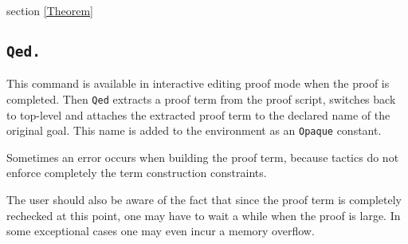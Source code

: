 \begin{ErrMsgs}
\item {}
\end{ErrMsgs}

\SeeAlso section \ref{Theorem}

\subsection{\tt Qed.}\label{Qed}
This command is available in interactive editing proof mode when the
proof is completed.  Then {\tt Qed} extracts a proof term from the
proof script, switches back to {\Coq} top-level and attaches the
extracted proof term to the declared name of the original goal. This
name is added to the environment as an {\tt Opaque} constant.

\begin{ErrMsgs}
\item {}
\item Sometimes an error occurs when building the proof term,
because tactics do not enforce completely the term construction
constraints.

The user should also be aware of the fact that since the proof term is
completely rechecked at this point, one may have to wait a while when
the proof is large. In some exceptional cases one may even incur a
memory overflow.
\end{ErrMsgs}

